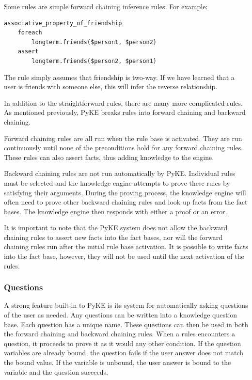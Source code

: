 \documentclass[11pt]{article} %
\begin{document}
Some rules are simple forward chaining inference rules.
For example:
\begin{Verbatim}[xleftmargin=2.5cm]
associative_property_of_friendship
    foreach
        longterm.friends($person1, $person2)
    assert
        longterm.friends($person2, $person1)
\end{Verbatim}

The rule simply assumes that friendship is two-way. If we have learned that a user is friends with someone else, this will infer the reverse relationship.

In addition to the straightforward rules, there are many more complicated rules. As mentioned previously, PyKE breaks rules into forward chaining and backward chaining.

Forward chaining rules are all run when the rule base is activated. They are run continuously until none of the preconditions hold for any forward chaining rules. These rules can also assert facts, thus adding knowledge to the engine.

Backward chaining rules are not run automatically by PyKE. Individual rules must be selected and the knowledge engine attempts to prove these rules by satisfying their arguments. During the proving process, the knowledge engine will often need to prove other backward chaining rules and look up facts from the fact bases. The knowledge engine then responds with either a proof or an error.

It is important to note that the PyKE system does not allow the backward chaining rules to assert new facts into the fact bases, nor will the forward chaining rules run after the initial rule base activation. It is possible to write facts into the fact base, however, they will not be used until the next activation of the rules.

\subsubsection{Questions}
A strong feature built-in to PyKE is its system for automatically asking questions of the user as needed. Any questions can be written into a knowledge question base. Each question has a unique name. These questions can then be used in both the forward chaining and backward chaining rules. When a rules encounters a question, it proceeds to prove it as it would any other condition. If the question variables are already bound, the question fails if the user answer does not match the bound value. If the variable is unbound, the user answer is bound to the variable and the question succeeds.
\end{document}
